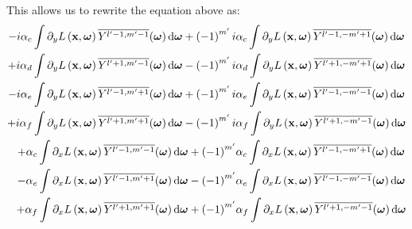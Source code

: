 This allows us to rewrite the equation above as:
\begin{align*}
-i\alpha_c\int{\partial_yL\left (\vec{x} ,\vec{\omega} \right )\overline{Y^{l'-1, m'-1}}(\vec{\omega} )\ud\vec{\omega}}
+\left({-1}\right)^{m'}i&\alpha_c\int{\partial_yL\left (\vec{x} ,\vec{\omega} \right )\overline{Y^{l'-1, -m'+1}}(\vec{\omega} )\ud\vec{\omega}}
\\
+i\alpha_d\int{\partial_yL\left (\vec{x} ,\vec{\omega} \right )\overline{Y^{l'+1, m'-1}}(\vec{\omega} )\ud\vec{\omega}}
-\left({-1}\right)^{m'} i &\alpha_d\int{\partial_yL\left (\vec{x} ,\vec{\omega} \right )\overline{Y^{l'+1, -m'+1}}(\vec{\omega} )\ud\vec{\omega}}
\\
-i\alpha_e \int{\partial_yL\left (\vec{x} ,\vec{\omega} \right )\overline{Y^{l'-1, m'+1}}(\vec{\omega} )\ud\vec{\omega}}
+\left({-1}\right)^{m'}i &\alpha_e \int{\partial_yL\left (\vec{x} ,\vec{\omega} \right )\overline{Y^{l'-1, -m'-1}}(\vec{\omega} )\ud\vec{\omega}}
\\
+i\alpha_f \int{\partial_yL\left (\vec{x} ,\vec{\omega} \right )\overline{Y^{l'+1, m'+1}}(\vec{\omega} )\ud\vec{\omega}}
-\left({-1}\right)^{m'}i &\alpha_f \int{\partial_yL\left (\vec{x} ,\vec{\omega} \right )\overline{Y^{l'+1, -m'-1}}(\vec{\omega} )\ud\vec{\omega}}
\\
+\alpha_c\int{\partial_xL\left (\vec{x} ,\vec{\omega} \right )\overline{Y^{l'-1, m'-1}}(\vec{\omega} )\ud\vec{\omega}}
+\left({-1}\right)^{m'}&\alpha_c\int{\partial_xL\left (\vec{x} ,\vec{\omega} \right )\overline{Y^{l'-1, -m'+1}}(\vec{\omega} )\ud\vec{\omega}}
\\
-\alpha_e\int{\partial_xL\left (\vec{x} ,\vec{\omega} \right )\overline{Y^{l'-1, m'+1}}(\vec{\omega} )\ud\vec{\omega}}
-\left({-1}\right)^{m'}&\alpha_e\int{\partial_xL\left (\vec{x} ,\vec{\omega} \right )\overline{Y^{l'-1, -m'-1}}(\vec{\omega} )\ud\vec{\omega}}
\\
+\alpha_f\int{\partial_xL\left (\vec{x} ,\vec{\omega} \right )\overline{Y^{l'+1, m'+1}}(\vec{\omega} )\ud\vec{\omega}}
+\left({-1}\right)^{m'}&\alpha_f\int{\partial_xL\left (\vec{x} ,\vec{\omega} \right )\overline{Y^{l'+1, -m'-1}}(\vec{\omega} )\ud\vec{\omega}}

\end{align*}
